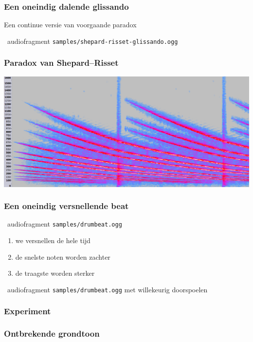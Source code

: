 \documentclass[compress, darktitle, framenumber, totalframenumber, handout]{beamer}
\begin{document}
\begin{frame}
  \frametitle{Een oneindig dalende glissando}

  Een continue versie van voorgaande paradox
  \begin{block}{\twonotes\ audiofragment}
    \texttt{samples/shepard-risset-glissando.ogg}
  \end{block}
\end{frame}

\begin{frame}
  \frametitle{Paradox van Shepard--Risset}

  \includegraphics[width=\textwidth]{images/glissando-spectrum.png}
\end{frame}

\begin{frame}
  \frametitle{Een oneindig versnellende beat}

  \begin{block}{\twonotes\ audiofragment}
    \texttt{samples/drumbeat.ogg}
  \end{block}

  \begin{enumerate}
    \item we versnellen de hele tijd
    \item de snelste noten worden zachter
    \item de traagste worden sterker
  \end{enumerate}
  \pause
  \begin{block}{\twonotes\ audiofragment}
    \texttt{samples/drumbeat.ogg} met willekeurig doorspoelen
  \end{block}
\end{frame}

\begin{frame}
  \frametitle{Experiment}
\end{frame}

\begin{frame}
  \frametitle{Ontbrekende grondtoon}
\end{frame}
\end{document}
